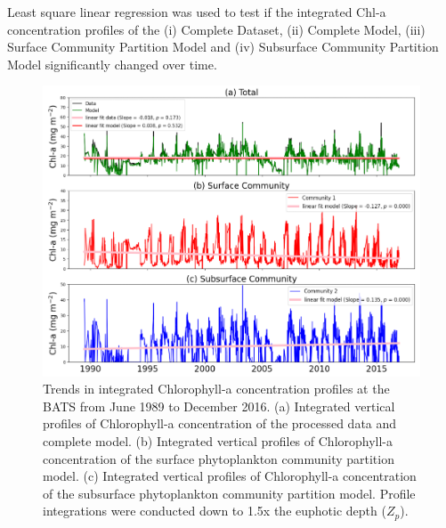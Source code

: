 \documentclass{article}
\begin{document}
\noindent
Least square linear regression was used to test if the integrated Chl-a concentration profiles of the (i) Complete Dataset, (ii) Complete Model, (iii) Surface Community Partition Model and (iv) Subsurface Community Partition Model significantly changed over time.
\begin{figure}[ht!]
\begin{center}
      \includegraphics[width=1\textwidth]{Analysis.PNG}
\end{center}
\caption{Trends in integrated Chlorophyll-a concentration profiles at the BATS from June 1989 to December 2016. (a) Integrated vertical profiles of Chlorophyll-a concentration of the processed data and complete model. (b) Integrated vertical profiles of Chlorophyll-a concentration of the surface phytoplankton community partition model. (c) Integrated vertical profiles of Chlorophyll-a concentration of the subsurface phytoplankton community partition model. Profile integrations were conducted down to 1.5x the euphotic depth ($Z_p$).}
\end{figure}
\end{document}
